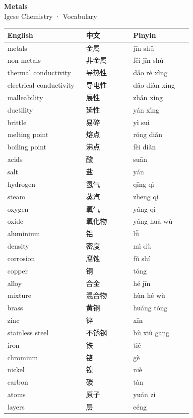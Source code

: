 \documentclass[11pt]{article}
\begin{document}
\begin{center}
  {\LARGE\bfseries Metals}\\[0.35em]
  {\large Igcse Chemistry · Vocabulary}
\end{center}
\vspace{0.6em}

\begin{longtable}{@{}p{0.40\linewidth}p{0.24\linewidth}p{0.30\linewidth}@{}}
\toprule
\textbf{English} & \textbf{中文} & \textbf{Pinyin} \\
\midrule
\endhead
\bottomrule
\endlastfoot
metals & 金属 & jīn shǔ \\
non-metals & 非金属 & fēi jīn shǔ \\
thermal conductivity & 导热性 & dǎo rè xìng \\
electrical conductivity & 导电性 & dǎo diàn xìng \\
malleability & 展性 & zhǎn xìng \\
ductility & 延性 & yán xìng \\
brittle & 易碎 & yì suì \\
melting point & 熔点 & róng diǎn \\
boiling point & 沸点 & fèi diǎn \\
acids & 酸 & suān \\
salt & 盐 & yán \\
hydrogen & 氢气 & qīng qì \\
steam & 蒸汽 & zhēng qì \\
oxygen & 氧气 & yǎng qì \\
oxide & 氧化物 & yǎng huà wù \\
aluminium & 铝 & lǚ \\
density & 密度 & mì dù \\
corrosion & 腐蚀 & fǔ shí \\
copper & 铜 & tóng \\
alloy & 合金 & hé jīn \\
mixture & 混合物 & hùn hé wù \\
brass & 黄铜 & huáng tóng \\
zinc & 锌 & xīn \\
stainless steel & 不锈钢 & bù xiù gāng \\
iron & 铁 & tiě \\
chromium & 铬 & gè \\
nickel & 镍 & niè \\
carbon & 碳 & tàn \\
atoms & 原子 & yuán zi \\
layers & 层 & céng \\

\end{longtable}
\end{document}
